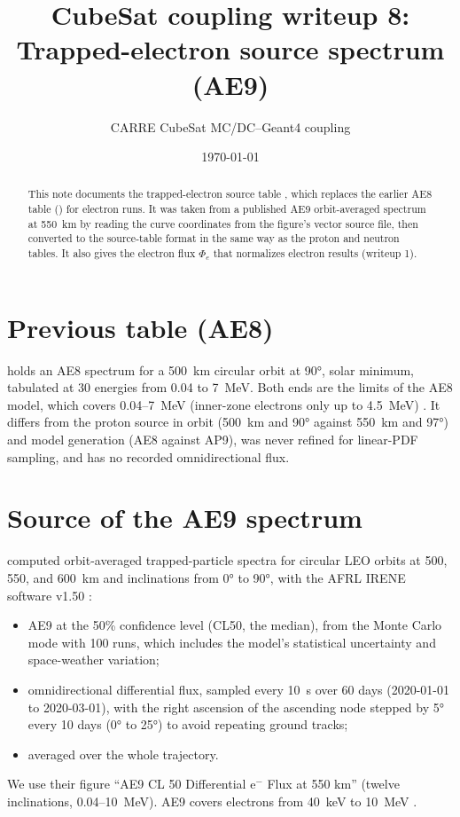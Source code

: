 

\title{CubeSat coupling writeup 8:\\Trapped-electron source spectrum (AE9)}
\author{CARRE CubeSat MC/DC--Geant4 coupling}
\date{\today}


\maketitle

\begin{abstract}
This note documents the trapped-electron source table , which replaces the earlier AE8 table () for electron runs. It was taken from a published AE9 orbit-averaged spectrum at 550~km by reading the curve coordinates from the figure's vector source file, then converted to the \mcdc{} source-table format in the same way as the proton and neutron tables. It also gives the electron flux $\Phi_e$ that normalizes electron results (writeup 1).
\end{abstract}

\section{Previous table (AE8)}
 holds an AE8 spectrum for a 500~km circular orbit at \ang{90}, solar minimum, tabulated at 30 energies from 0.04 to \SI{7}{MeV}. Both ends are the limits of the AE8 model, which covers 0.04--\SI{7}{MeV} (inner-zone electrons only up to \SI{4.5}{MeV}) \citep{vette1991ae8}. It differs from the proton source in orbit (500~km and \ang{90} against 550~km and \ang{97}) and model generation (AE8 against AP9), was never refined for linear-PDF sampling, and has no recorded omnidirectional flux.

\section{Source of the AE9 spectrum}
\citet{ripa2020comparison} computed orbit-averaged trapped-particle spectra for circular LEO orbits at 500, 550, and 600~km and inclinations from \ang{0} to \ang{90}, with the AFRL IRENE software v1.50 \citep{ginet2013ae9}:
\begin{itemize}
  \item AE9 at the 50\% confidence level (CL50, the median), from the Monte Carlo mode with 100 runs, which includes the model's statistical uncertainty and space-weather variation;
  \item omnidirectional differential flux, sampled every \SI{10}{s} over 60 days (2020-01-01 to 2020-03-01), with the right ascension of the ascending node stepped by \ang{5} every 10 days (\ang{0} to \ang{25}) to avoid repeating ground tracks;
  \item averaged over the whole trajectory.
\end{itemize}
We use their figure ``AE9 CL 50 Differential e$^-$ Flux at 550 km'' (twelve inclinations, 0.04--\SI{10}{MeV}). AE9 covers electrons from \SI{40}{keV} to \SI{10}{MeV} \citep{ginet2013ae9}.

